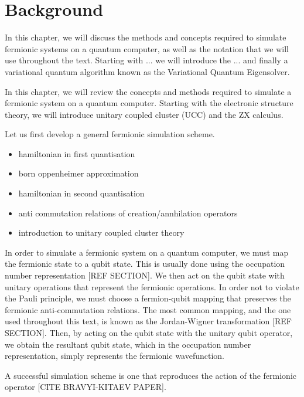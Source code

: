 \chapter{\label{background}Background}
In this chapter, we will discuss the methods and concepts required to simulate fermionic systems on a quantum computer, as well as the notation that we will use throughout the text. Starting with ... we will introduce the ... and finally a variational quantum algorithm known as the Variational Quantum Eigensolver.

In this chapter, we will review the concepts and methods required to simulate a fermionic system on a quantum computer. Starting with the electronic structure theory, we will introduce unitary coupled cluster (UCC) and the ZX calculus.

Let us first develop a general fermionic simulation scheme.

\begin{itemize}
    \item hamiltonian in first quantisation
    \item born oppenheimer approximation
    \item hamiltonian in second quantisation
    \item anti commutation relations of creation/annhilation operators
    \item introduction to unitary coupled cluster theory
\end{itemize}

In order to simulate a fermionic system on a quantum computer, we must map the fermionic state to a qubit state. This is usually done using the occupation number representation [REF SECTION]. We then act on the qubit state with unitary operations that represent the fermionic operations. In order not to violate the Pauli principle, we must choose a fermion-qubit mapping that preserves the fermionic anti-commutation relations. The most common mapping, and the one used throughout this text, is known as the Jordan-Wigner transformation [REF SECTION]. Then, by acting on the qubit state with the unitary qubit operator, we obtain the resultant qubit state, which in the occupation number representation, simply represents the fermionic wavefunction.

A successful simulation scheme is one that reproduces the action of the fermionic operator [CITE BRAVYI-KITAEV PAPER].



\begin{comment}
remove 'simulation' scheme stuff. this is the introduction of the background. briefly recap that's all.
\end{comment}
